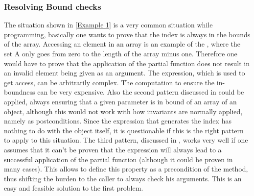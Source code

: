 \subsubsection{Resolving Bound checks}
The situation shown in \ref{Example 1} is a very common situation while programming, basically one wants to prove that the index is always in the bounds of the array. Accessing an element in an array is an example of the , where the set A only goes from zero to the length of the array minus one. Therefore one would have to prove that the application of the partial function does not result in an invalid element being given as an argument. The expression, which is used to get access, can be arbitrarily complex. The computation to ensure the in-boundness can be very expensive.  \newline
Also the second pattern discussed in  could be applied, always ensuring that a given parameter is in bound of an array of an object, although this would not work with how invariants are normally applied, namely as postconditions. Since the expression that generates the index has nothing to do with the object itself, it is questionable if this is the right pattern to apply to this situation. \newline
The third pattern, discussed in , works very well if one assumes that it can't be proven that the expression will always lead to a successful application of the partial function (although it could be proven in many cases). This allows to define this property as a precondition of the method, thus shifting the burden to the caller to always check his arguments. This is an easy and feasible solution to the first problem. 

